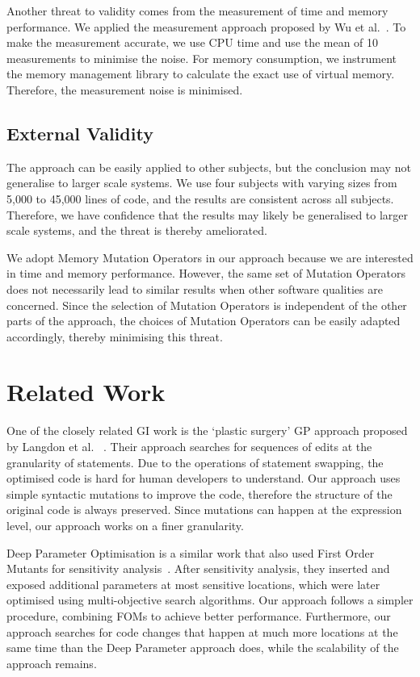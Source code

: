 \documentclass[oribibl]{llncs}
\begin{document}
{Another threat to validity comes from the measurement of time and memory performance. We applied the measurement approach proposed by Wu et al.~\cite{Wu:2015:DPO:2739480.2754648}. 
To make the measurement accurate, we use CPU time and use the mean of 10 measurements to minimise the noise.
For memory consumption, we instrument the memory management library to calculate the exact use of virtual memory.
Therefore, the measurement noise is minimised.

\subsection{External Validity}
\label{sec_externalvalidity}

The approach can be easily applied to other subjects, but the conclusion may not generalise to larger scale systems.
We use four subjects with varying sizes from 5,000 to 45,000 lines of code, and the results are consistent across all subjects.
Therefore, we have confidence that the results may likely be generalised to larger scale systems, and the threat is thereby ameliorated.

We adopt Memory Mutation Operators in our approach because we are interested in time and memory performance.
However, the same set of Mutation Operators does not necessarily lead to similar results when other software qualities are concerned.
Since the selection of Mutation Operators is independent of the other parts of the approach, the choices of Mutation Operators can be easily adapted accordingly, thereby minimising this threat.

\section{Related Work}
\label{sec_related}
\vspace{-2mm}
One of the closely related GI work is the `plastic surgery' GP approach proposed by Langdon et al. ~\cite{6733370,Langdon:2014:IMI:2576768.2598244}.
Their approach searches for sequences of edits at the granularity of statements. 
Due to the operations of statement swapping, the optimised code is hard for human developers to understand.
Our approach uses simple syntactic mutations to improve the code, therefore the structure of the original code is always preserved.
Since mutations can happen at the expression level, our approach works on a finer granularity.

Deep Parameter Optimisation is a similar work that also used First Order Mutants for sensitivity analysis~\cite{Wu:2015:DPO:2739480.2754648}.
After sensitivity analysis, they inserted and exposed additional parameters at most sensitive locations, which were later optimised using multi-objective search algorithms.
Our approach follows a simpler procedure, combining FOMs to achieve better performance.
Furthermore, our approach searches for code changes that happen at much more locations at the same time than the Deep Parameter approach does, while the scalability of the approach remains.

}
\end{document}
